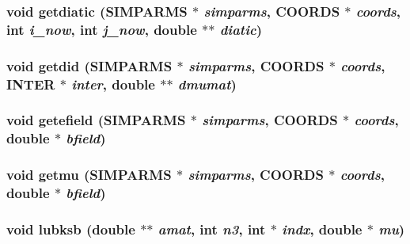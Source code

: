 \subsubsection{\setlength{\rightskip}{0pt plus 5cm}void getdiatic ({\bf SIMPARMS} $\ast$ {\em simparms}, {\bf COORDS} $\ast$ {\em coords}, int {\em i\_\-now}, int {\em j\_\-now}, double $\ast$$\ast$ {\em diatic})}\label{polar_2getdid_8c_1c6fec36594dae1f1269588c537f854a}


\subsubsection{\setlength{\rightskip}{0pt plus 5cm}void getdid ({\bf SIMPARMS} $\ast$ {\em simparms}, {\bf COORDS} $\ast$ {\em coords}, {\bf INTER} $\ast$ {\em inter}, double $\ast$$\ast$ {\em dmumat})}\label{polar_2getdid_8c_435b47f9a2e2d0b696f34fd100b1fd50}


\subsubsection{\setlength{\rightskip}{0pt plus 5cm}void getefield ({\bf SIMPARMS} $\ast$ {\em simparms}, {\bf COORDS} $\ast$ {\em coords}, double $\ast$ {\em bfield})}\label{polar_2getdid_8c_fb04992ab9d7a7e23cb137d4f8812ffd}


\subsubsection{\setlength{\rightskip}{0pt plus 5cm}void getmu ({\bf SIMPARMS} $\ast$ {\em simparms}, {\bf COORDS} $\ast$ {\em coords}, double $\ast$ {\em bfield})}\label{polar_2getdid_8c_bf233a7825d1df90cc98eab93c6e7e86}


\subsubsection{\setlength{\rightskip}{0pt plus 5cm}void lubksb (double $\ast$$\ast$ {\em amat}, int {\em n3}, int $\ast$ {\em indx}, double $\ast$ {\em mu})}\label{polar_2getdid_8c_54bcae607151fcf53a488d7ce4fd111e}


